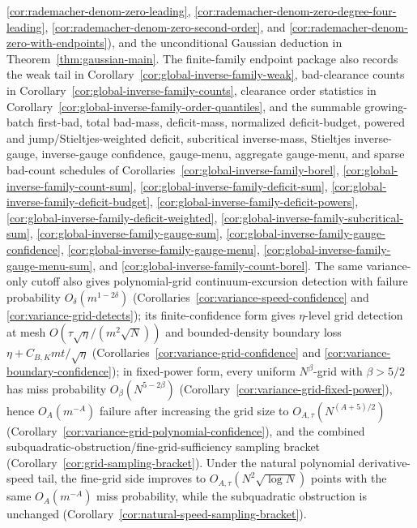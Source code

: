 \documentclass[11pt]{amsart}
\numberwithin{equation}{section}
\theoremstyle{definition}
\theoremstyle{remark}
\begin{document}
\begin{itemize}
\ref{cor:rademacher-denom-zero-leading}, \ref{cor:rademacher-denom-zero-degree-four-leading}, \ref{cor:rademacher-denom-zero-second-order}, and \ref{cor:rademacher-denom-zero-with-endpoints}), and the unconditional Gaussian deduction in Theorem~\ref{thm:gaussian-main}.
The finite-family endpoint package also records the weak tail in
Corollary~\ref{cor:global-inverse-family-weak}, bad-clearance counts in
Corollary~\ref{cor:global-inverse-family-counts}, clearance order statistics in
Corollary~\ref{cor:global-inverse-family-order-quantiles}, and the summable
growing-batch first-bad, total bad-mass, deficit-mass, normalized
deficit-budget, powered and jump/Stieltjes-weighted deficit, subcritical inverse-mass,
Stieltjes inverse-gauge, inverse-gauge confidence, gauge-menu, aggregate gauge-menu,
and sparse bad-count schedules of
Corollaries~\ref{cor:global-inverse-family-borel},
\ref{cor:global-inverse-family-count-sum},
\ref{cor:global-inverse-family-deficit-sum},
\ref{cor:global-inverse-family-deficit-budget},
\ref{cor:global-inverse-family-deficit-powers},
\ref{cor:global-inverse-family-deficit-weighted},
\ref{cor:global-inverse-family-subcritical-sum},
\ref{cor:global-inverse-family-gauge-sum},
\ref{cor:global-inverse-family-gauge-confidence},
\ref{cor:global-inverse-family-gauge-menu},
\ref{cor:global-inverse-family-gauge-menu-sum}, and
\ref{cor:global-inverse-family-count-borel}.
The same variance-only cutoff also gives polynomial-grid continuum-excursion
detection with failure probability \(O_\delta(m^{1-2\delta})\)
(Corollaries~\ref{cor:variance-speed-confidence} and
\ref{cor:variance-grid-detects}); its finite-confidence form gives
\(\eta\)-level grid detection at mesh
\(O(\tau\sqrt\eta/(m^2\sqrt N))\) and bounded-density boundary loss
\(\eta+C_{B,K}mt/\sqrt\eta\)
(Corollaries~\ref{cor:variance-grid-confidence} and
\ref{cor:variance-boundary-confidence}); in fixed-power form, every
uniform \(N^\beta\)-grid with \(\beta>5/2\) has miss probability
\(O_\beta(N^{5-2\beta})\)
(Corollary~\ref{cor:variance-grid-fixed-power}), hence
  \(O_A(m^{-A})\) failure after increasing the grid size to
\(O_{A,\tau}(N^{(A+5)/2})\)
(Corollary~\ref{cor:variance-grid-polynomial-confidence}), and the combined
subquadratic-obstruction/fine-grid-sufficiency sampling bracket
(Corollary~\ref{cor:grid-sampling-bracket}).
Under the natural polynomial derivative-speed tail, the fine-grid side improves
to \(O_{A,\tau}(N^2\sqrt{\log N})\) points with the same \(O_A(m^{-A})\)
miss probability, while the subquadratic obstruction is unchanged
(Corollary~\ref{cor:natural-speed-sampling-bracket}).

\end{itemize}
\end{document}
